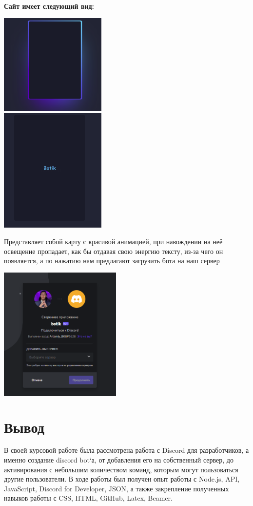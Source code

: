 \documentclass[a4paper,12pt]{article}
\begin{document}
\begin{center}
\textbf{Сайт имеет следующий вид:}
\end{center}
\centerline{\includegraphics[width = 200px]{pictures/Site.png}\\ \includegraphics[width = 200px]{pictures/site2.png}}
Представляет собой карту с красивой анимацией, при навождении на неё освещение пропадает, как бы отдавая свою энергию тексту, из-за чего он появляется, а по нажатию нам предлагают загрузить бота на наш сервер
\centerline{\includegraphics[width = 230px]{pictures/linklink.png}}

\newpage
\section{Вывод}
\Large
В своей курсовой работе была рассмотрена работа с Discord для разработчиков, а именно создание discord bot`а, от добавления его на собственный сервер, до активирования с небольшим количеством команд, которым могут пользоваться другие пользователи. В ходе работы был получен опыт работы с Node.js, API, JavaScript, Discord for Developer, JSON, а также закрепление полученных навыков работы с CSS, HTML, GitHub, Latex, Beamer. \\
\end{document}
